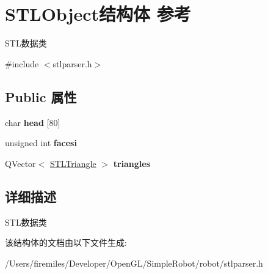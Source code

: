 \hypertarget{struct_s_t_l_object}{}\section{S\+T\+L\+Object结构体 参考}
\label{struct_s_t_l_object}


S\+T\+L数据类  




{\ttfamily \#include $<$stlparser.\+h$>$}

\subsection*{Public 属性}
\begin{DoxyCompactItemize}
\item 
\hypertarget{struct_s_t_l_object_a385ba72b6015a1bb21f5b10ca73286bb}{}char {\bfseries head} \mbox{[}80\mbox{]}\label{struct_s_t_l_object_a385ba72b6015a1bb21f5b10ca73286bb}

\item 
\hypertarget{struct_s_t_l_object_a0776d4ee4c46846cac60f3a7d5f4e386}{}unsigned int {\bfseries facesi}\label{struct_s_t_l_object_a0776d4ee4c46846cac60f3a7d5f4e386}

\item 
\hypertarget{struct_s_t_l_object_a503e3a79bdee4e54e134b211c0771279}{}Q\+Vector$<$ \hyperlink{struct_s_t_l_triangle}{S\+T\+L\+Triangle} $>$ {\bfseries triangles}\label{struct_s_t_l_object_a503e3a79bdee4e54e134b211c0771279}

\end{DoxyCompactItemize}


\subsection{详细描述}
S\+T\+L数据类 

该结构体的文档由以下文件生成\+:\begin{DoxyCompactItemize}
\item 
/\+Users/firemiles/\+Developer/\+Open\+G\+L/\+Simple\+Robot/robot/stlparser.\+h\end{DoxyCompactItemize}
